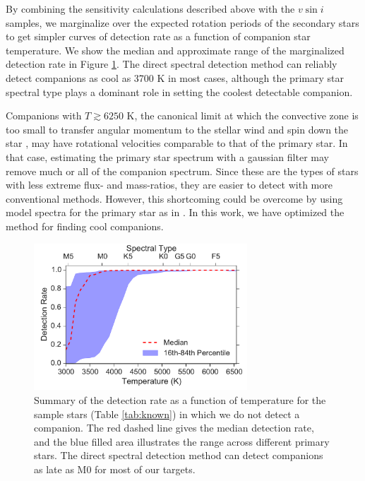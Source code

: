 \documentclass{emulateapj}
\begin{document}
By combining the sensitivity calculations described above with the $v\sin{i}$ samples, we marginalize over the expected rotation periods of the secondary stars to get simpler curves of detection rate as a function of companion star temperature. We show the median and approximate range of the marginalized detection rate in Figure \ref{fig:sensitivity}. The direct spectral detection method can reliably detect companions as cool as 3700 K in most cases, although the primary star spectral type plays a dominant role in setting the coolest detectable companion. 

Companions with $T \gtrsim 6250$ K, the canonical limit at which the convective zone is too small to transfer angular momentum to the stellar wind and spin down the star \citep{Pinsonneault2001}, may have rotational velocities comparable to that of the primary star. In that case, estimating the primary star spectrum with a gaussian filter may remove much or all of the companion spectrum. Since these are the types of stars with less extreme flux- and mass-ratios, they are easier to detect with more conventional methods. However, this shortcoming could be overcome by using model spectra for the primary star as in \citet{Kolbl2015}. In this work, we have optimized the method for finding cool companions.


\begin{figure}
        \centering
        \includegraphics[width=80mm]{DetectionRate.pdf}

         \caption{Summary of the detection rate as a function of temperature for the sample stars (Table \ref{tab:known}) in which we do not detect a companion. The red dashed line gives the median detection rate, and the blue filled area illustrates the range across different primary stars. The direct spectral detection method can detect companions as late as M0 for most of our targets.}
         \label{fig:sensitivity}
\end{figure}
\end{document}
